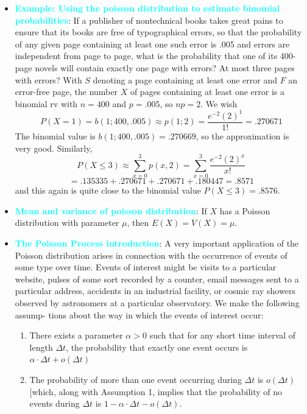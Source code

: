 \documentclass{report}
\begin{document}
\begin{itemize}
    \item \textbf{\textcolor{cyan}{Example: Using the poisson distribution to estimate binomial probabilities}}:
        \bigbreak \noindent 
        If a publisher of nontechnical books takes great pains to ensure that its books are free of typographical errors, so that the probability of any given page containing at least one such error is .005 and errors are independent from page to page, what is the probability that one of its 400-page novels will contain exactly one page with errors? At most three pages with errors?
        \bigbreak \noindent 
        With \( S \) denoting a page containing at least one error and \( F \) an error-free page, the number \( X \) of pages containing at least one error is a binomial rv with \( n = 400 \) and \( p = .005 \), so \( np = 2 \). We wish
        \[
            P(X = 1) = b(1; 400, .005) \approx p(1; 2) = \frac{e^{-2}(2)^1}{1!} = .270671
        \]
        The binomial value is \( b(1; 400, .005) = .270669 \), so the approximation is very good.
        \bigbreak \noindent 
        Similarly,
        \[
            P(X \leq 3) \approx \sum_{x=0}^{3} p(x, 2) = \sum_{x=0}^{3} \frac{e^{-2} (2)^x}{x!}
        \]
        \bigbreak \noindent 
        \[
            = .135335 + .270671 + .270671 + .180447 = .8571
        \]
        and this again is quite close to the binomial value \( P(X \leq 3) = .8576 \).
    \item \textbf{\textcolor{cyan}{Mean and variance of poisson distribution}}:
        If \( X \) has a Poisson distribution with parameter \( \mu \), then \( E(X) = V(X) = \mu \).
    \item \textbf{\textcolor{cyan}{The Poisson Process introduction}}:
        A very important application of the Poisson distribution arises in connection with the
        occurrence of events of some type over time. Events of interest might be visits to a
        particular website, pulses of some sort recorded by a counter, email messages sent
        to a particular address, accidents in an industrial facility, or cosmic ray showers
        observed by astronomers at a particular observatory. We make the following assump-
        tions about the way in which the events of interest occur:
        \begin{enumerate}
            \item There exists a parameter $\alpha > 0$ such that for any short time interval of length $\Delta t$, the probability that exactly one event occurs is $\alpha \cdot \Delta t + o(\Delta t)$
            \item The probability of more than one event occurring during $\Delta t$ is $o(\Delta t)$ [which, along with Assumption 1, implies that the probability of no events during $\Delta t$ is $1 - \alpha \cdot \Delta t - o(\Delta t)$.

\end{enumerate}
\end{itemize}
\end{document}
